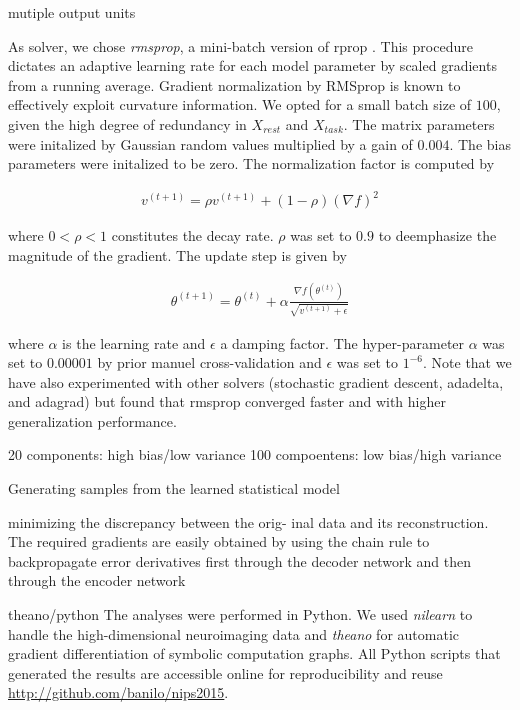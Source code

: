 \documentclass{article} %
\begin{document}
mutiple output units

\linebreak

As solver, we chose \textit{rmsprop},
a mini-batch version of rprop \cite{dauphin2015rmsprop}.
This procedure dictates an adaptive learning rate
for each model parameter by
scaled gradients from a running average.
Gradient normalization by RMSprop
is known to effectively exploit curvature information.
We opted for a small batch size of $100$, given the high degree of
redundancy in $X_{rest}$ and $X_{task}$.
The matrix parameters were initalized by Gaussian random values multiplied
by a gain of $0.004$. The bias parameters were initalized to be zero.
The normalization factor is computed by

\begin{eqnarray*}
v^{(t+1)} = \rho v^{(t+1)} + (1 - \rho)(\nabla f)^2
\end{eqnarray*}

where $0 < \rho < 1$ constitutes the decay rate. $\rho$ was set to
$0.9$ to deemphasize the magnitude of the gradient.
The update step is
given by 

\begin{eqnarray*}
\theta^{(t+1)} = \theta^{(t)} + \alpha \frac{\nabla f(\theta^{(t)})}{\sqrt{v^{(t+1)} + \epsilon}}
\end{eqnarray*}

where $\alpha$ is the learning rate and $\epsilon$ a damping factor.
The hyper-parameter $\alpha$ was set to $0.00001$ by prior manuel
cross-validation and $\epsilon$ was set to $1^{-6}$.
%
Note that we have also experimented with other solvers
(stochastic gradient descent, adadelta, and adagrad) but found that
rmsprop converged faster and with higher generalization performance.

\linebreak


20 components: high bias/low variance
100 compoentens: low bias/high variance



Generating samples from the learned statistical model

minimizing the discrepancy between the orig- inal data and its reconstruction.
The required gradients are easily obtained by using the chain rule to
backpropagate error derivatives first through the decoder network
and then through the encoder network 

theano/python
The analyses were performed in Python.
We used \textit{nilearn} to handle
the high-dimensional neuroimaging data and
\textit{theano} for automatic gradient
differentiation of symbolic computation graphs.
All Python scripts that generated the results are
accessible online for reproducibility and reuse
\url{http://github.com/banilo/nips2015}.
\end{document}
